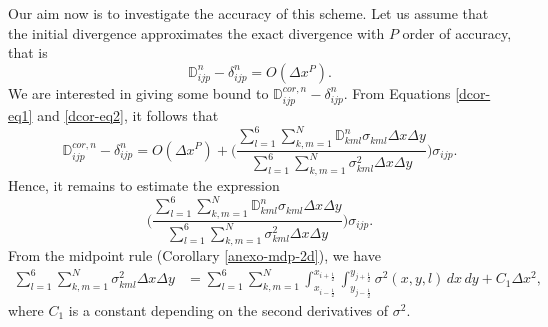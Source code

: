 Our aim now is to investigate the accuracy of this scheme.
Let us assume that the initial divergence approximates the exact divergence with $P$ order
of accuracy, that is
\begin{equation}
\label{dcor-eq2}
	\mathbb{D}^n_{ijp} - \mathbb{\delta}^n_{ijp} = O(\Delta x^P).
\end{equation}
We are interested in giving some bound to 
$\mathbb{D}^{cor,n}_{ijp} - \mathbb{\delta}^n_{ijp}$.
From Equations \eqref{dcor-eq1} and \eqref{dcor-eq2}, it follows that
\begin{equation}
	\label{dcor-eq3}
	\mathbb{D}^{cor,n}_{ijp} - \mathbb{\delta}^n_{ijp} =
	O(\Delta x^P) +  
\bigg( \frac{\sum_{l=1}^6 \sum_{k,m=1}^N \mathbb{D}_{kml}^n \sigma_{kml} \Delta x \Delta y}
{\sum_{l=1}^6 \sum_{k,m=1}^N \sigma_{kml}^2 \Delta x \Delta y}\bigg)\sigma_{ijp}. 
\end{equation}
Hence, it remains to estimate the expression
\begin{equation}
	\label{dcor-eq4}
	\bigg( \frac{\sum_{l=1}^6 \sum_{k,m=1}^N \mathbb{D}_{kml}^n \sigma_{kml} \Delta x \Delta y}
	{\sum_{l=1}^6 \sum_{k,m=1}^N \sigma_{kml}^2 \Delta x \Delta y}\bigg)\sigma_{ijp}.
\end{equation}
From the midpoint rule (Corollary \ref{anexo-mdp-2d}), we have
\begin{align}
	\sum_{l=1}^6 \sum_{k,m=1}^N	\mathbb \sigma_{kml}^2 {\Delta x \Delta y}  &= 
	\sum_{l=1}^6 \sum_{k,m=1}^N
	\int_{x_{i-{\frac{1}{2}}}}^{x_{i+{\frac{1}{2}}}}
	\int_{y_{j-{\frac{1}{2}}}}^{y_{j+{\frac{1}{2}}}}
	\sigma^2(x,y,l) \,dx \,dy
	+C_1\Delta x^2,
\label{dcor-eq5}
\end{align}
where $C_1$ is a constant depending on the second derivatives of $\sigma^2$.

